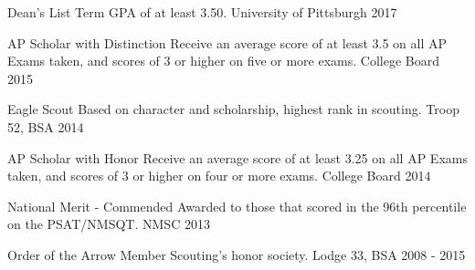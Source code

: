 
\vspace{-1mm}
\begin{cvhonors}

  \cvhonor
    {Dean's List} %
    {Term GPA of at least 3.50.} %
    {University of Pittsburgh} %
    {2017} %

  \cvhonor
    {AP Scholar with Distinction} %
    {Receive an average score of at least 3.5 on all AP Exams taken, and scores of 3 or higher on five or more exams.} %
    {College Board} %
    {2015} %

  \cvhonor
    {Eagle Scout} %
    {Based on character and scholarship, highest rank in scouting.} %
    {Troop 52, BSA} %
    {2014} %

  \cvhonor
    {AP Scholar with Honor} %
    {Receive an average score of at least 3.25 on all AP Exams taken, and scores of 3 or higher on four or more exams.} %
    {College Board} %
    {2014} %

  \cvhonor
    {National Merit - Commended} %
    {Awarded to those that scored in the 96th percentile on the PSAT/NMSQT.} %
    {NMSC} %
    {2013} %

  \cvhonor
    {Order of the Arrow Member} %
    {Scouting’s honor society.} %
    {Lodge 33, BSA} %
    {2008 - 2015} %

\end{cvhonors}
